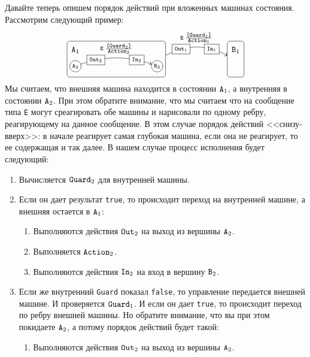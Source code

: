 \documentclass{article}
\begin{document}
{Давайте теперь опишем порядок действий при вложенных машинах состояния.
Рассмотрим следующий пример:
\[
\xymatrix{
  *+=+[o][F-]{\scriptstyle\texttt{A}_2}\save="A" \restore
  \ar@{}[r]^(0){\raisebox{14pt}{$\texttt{A}_1$}}
  \ar@/^10pt/[rrr]^{\raisebox{6pt}{$\scriptstyle\texttt{E}\; \frac{\scriptstyle \texttt{[Guard}_2\texttt{]}}{\scriptstyle \texttt{Action}_2}$}}|(0.25){\boxed{\scriptstyle\texttt{Out}_2}}|(0.75){\boxed{\scriptstyle\texttt{In}_2}}&{}&{}&
  *+=+[o][F-]{\scriptstyle\texttt{B}_2}\save="B" \restore
  \ar@{}@<13pt>[rrr]|(0.11){}="U"|(0.89){}="W"
  \ar@/^10pt/ "U" ; "W"^{\raisebox{6pt}{$\scriptstyle\texttt{E}\; \frac{\scriptstyle \texttt{[Guard}_1\texttt{]}}{\scriptstyle \texttt{Action}_1}$}}|(0.25){\boxed{\scriptstyle\texttt{Out}_1}}|(0.75){\boxed{\scriptstyle\texttt{In}_1}}
  &
  {}
  &
  {}
  &
  {}\save="C" \restore\ar@{}[l]_(0){\raisebox{14pt}{$\texttt{B}_1$}}
    \save"A" + <-10pt, 30pt>="AA" \restore 
   \save "B" + <4pt, -7pt>="BB"\restore
  {\save "AA"."BB"*+[F-:<3pt>]\frm{}\restore}
    \save"C" + <-10pt, 30pt>="CC" \restore 
   \save "C" + <4pt, -7pt>="DD"\restore
  {\save "CC"."DD"*+[F-:<3pt>]\frm{}\restore}
  \\
}
\]
Мы считаем, что внешняя машина находится в состоянии $\verb"A"_1$, а внутренняя в состоянии $\verb"A"_2$.
При этом обратите внимание, что мы считаем что на сообщение типа \verb"E" могут среагировать обе машины и нарисовали по одному ребру, реагирующему на данное сообщение.
В этом случае порядок действий <<снизу-вверх>>: в начале реагирует самая глубокая машина, если она не реагирует, то ее содержащая и так далее.
В нашем случае процесс исполнения будет следующий:
\begin{enumerate}
\item Вычисляется $\verb"Guard"_2$ для внутренней машины.

\item Если он дает результат \verb"true", то происходит переход на внутренней машине, а внешняя остается в $\verb"A"_1$:
\begin{enumerate}
\item Выполняются действия $\verb"Out"_2$ на выход из вершины $\verb"A"_2$.

\item Выполняется $\verb"Action"_2$.

\item Выполняются действия $\verb"In"_2$ на вход в вершину $\verb"B"_2$.
\end{enumerate}

\item Если же внутренний \verb"Guard" показал \verb"false", то управление передается внешней машине.
И проверяется $\verb"Guard"_1$.
И если он дает \verb"true", то происходит переход по ребру внешней машины.
Но обратите внимание, что вы при этом покидаете $\verb"A"_2$, а потому порядок действий будет такой:
\begin{enumerate}
\item Выполняются действия $\verb"Out"_2$ на выход из вершины $\verb"A"_2$.


\end{enumerate}
\end{enumerate}}
\end{document}
